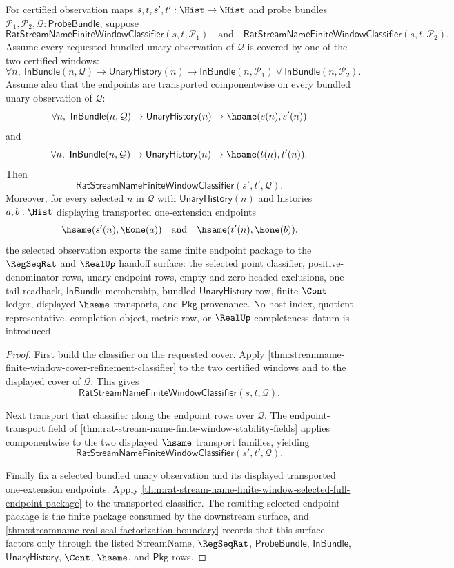 \begin{theorem}
\label{thm:streamname-cover-refinement-transport-closure}
For certified observation maps $s,t,s',t':\Hist\to\Hist$ and probe bundles
$\mathcal{P}_1,\mathcal{P}_2,\mathcal{Q}:\mathsf{ProbeBundle}$, suppose
$$
\mathsf{RatStreamNameFiniteWindowClassifier}(s,t,\mathcal{P}_1)
\quad\text{and}\quad
\mathsf{RatStreamNameFiniteWindowClassifier}(s,t,\mathcal{P}_2).
$$
Assume every requested bundled unary observation of $\mathcal{Q}$ is covered
by one of the two certified windows:
$$
\forall n,\ \mathsf{InBundle}(n,\mathcal{Q})\to
\mathsf{UnaryHistory}(n)\to
\mathsf{InBundle}(n,\mathcal{P}_1)\lor
\mathsf{InBundle}(n,\mathcal{P}_2).
$$
Assume also that the endpoints are transported componentwise on every bundled
unary observation of $\mathcal{Q}$:
$$
\forall n,\ \mathsf{InBundle}(n,\mathcal{Q})\to
\mathsf{UnaryHistory}(n)\to\hsame(s(n),s'(n))
$$
and
$$
\forall n,\ \mathsf{InBundle}(n,\mathcal{Q})\to
\mathsf{UnaryHistory}(n)\to\hsame(t(n),t'(n)).
$$
Then
$$
\mathsf{RatStreamNameFiniteWindowClassifier}(s',t',\mathcal{Q}).
$$
Moreover, for every selected $n$ in $\mathcal{Q}$ with
$\mathsf{UnaryHistory}(n)$ and histories $a,b:\Hist$ displaying transported
one-extension endpoints
$$
\hsame(s'(n),\Eone(a))\quad\text{and}\quad \hsame(t'(n),\Eone(b)),
$$
the selected observation exports the same finite endpoint package to the
$\RegSeqRat$ and $\RealUp$ handoff surface: the selected point classifier,
positive-denominator rows, unary endpoint rows, empty and zero-headed
exclusions, one-tail readback, $\mathsf{InBundle}$ membership, bundled
$\mathsf{UnaryHistory}$ row, finite $\Cont$ ledger, displayed $\hsame$
transports, and $\mathsf{Pkg}$ provenance. No host index, quotient
representative, completion object, metric row, or $\RealUp$ completeness datum
is introduced.
\end{theorem}
\begin{proof}
First build the classifier on the requested cover. Apply
\autoref{thm:streamname-finite-window-cover-refinement-classifier} to the two
certified windows and to the displayed cover of $\mathcal{Q}$. This gives
$$
\mathsf{RatStreamNameFiniteWindowClassifier}(s,t,\mathcal{Q}).
$$

Next transport that classifier along the endpoint rows over $\mathcal{Q}$.
The endpoint-transport field of
\autoref{thm:rat-stream-name-finite-window-stability-fields} applies
componentwise to the two displayed $\hsame$ transport families, yielding
$$
\mathsf{RatStreamNameFiniteWindowClassifier}(s',t',\mathcal{Q}).
$$

Finally fix a selected bundled unary observation and its displayed transported
one-extension endpoints. Apply
\autoref{thm:rat-stream-name-finite-window-selected-full-endpoint-package} to
the transported classifier. The resulting selected endpoint package is the
finite package consumed by the downstream surface, and
\autoref{thm:streamname-real-seal-factorization-boundary} records that this
surface factors only through the listed StreamName, $\RegSeqRat$,
$\mathsf{ProbeBundle}$, $\mathsf{InBundle}$, $\mathsf{UnaryHistory}$,
$\Cont$, $\hsame$, and $\mathsf{Pkg}$ rows.
\end{proof}

